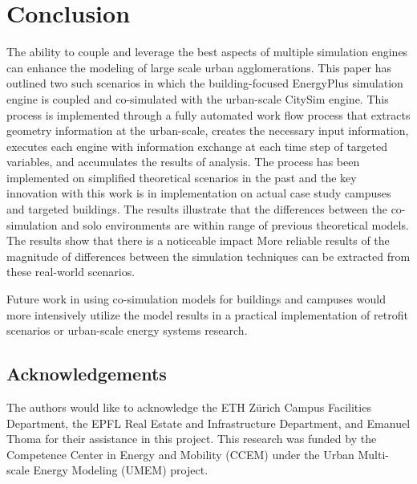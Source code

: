 \documentclass{tBPS2e}
\theoremstyle{plain}
\theoremstyle{definition}
\theoremstyle{remark}
\newcommand{\noteDT}[1]{\footnote{\textcolor{green}{#1}}}
\begin{document}


\section{Conclusion}
The ability to couple and leverage the best aspects of multiple simulation
engines can enhance the modeling of large scale urban agglomerations. This
paper has outlined two such scenarios in which the building-focused EnergyPlus
simulation engine is coupled and co-simulated with the urban-scale CitySim
engine. This process is implemented through a fully automated work flow
process that extracts geometry information at the
urban-scale, creates the necessary input information, executes each engine
with information exchange at each time step of targeted variables, and
accumulates the results of analysis. The process has been implemented on
simplified theoretical scenarios in the past and the key innovation with this
work is in implementation on actual case study campuses and targeted
buildings. The results illustrate that the differences between the co-
simulation and solo environments are within range of previous theoretical
models. The results show that there is a noticeable impact 
More reliable results of the magnitude of differences between the
simulation techniques can be extracted from these real-world scenarios. 

Future work in using co-simulation models for buildings and campuses would
more intensively utilize the model results in a practical implementation of
retrofit scenarios or urban-scale energy systems research.

\subsection{Acknowledgements}
The authors would like to acknowledge the ETH Z\"urich Campus Facilities
Department, the EPFL Real Estate and Infrastructure Department, and Emanuel
Thoma for their assistance in this project. This research was funded by the
Competence Center in Energy and Mobility (CCEM) under the Urban Multi-scale
Energy Modeling (UMEM) project. 



\end{document}
